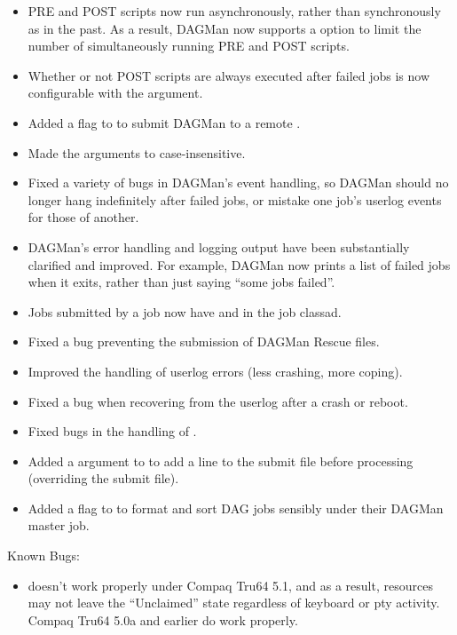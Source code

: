 \begin{itemize}

\item
PRE and POST scripts now run asynchronously, rather than synchronously
as in the past.  As a result, DAGMan now supports a 
option to limit the number of simultaneously running PRE and POST
scripts.

\item
Whether or not POST scripts are always executed after failed jobs is
now configurable with the  argument.

\item
Added a  flag to  to submit DAGMan to a
remote .

\item
Made the arguments to  case-insensitive.

\item
Fixed a variety of bugs in DAGMan's event handling, so DAGMan should
no longer hang indefinitely after failed jobs, or mistake one job's
userlog events for those of another.

\item
DAGMan's error handling and logging output have been substantially
clarified and improved.  For example, DAGMan now prints a list of
failed jobs when it exits, rather than just saying ``some jobs
failed''.

\item
Jobs submitted by a  job now have 
and  in the job classad.

\item
Fixed a  bug preventing the submission of DAGMan
Rescue files.

\item
Improved the handling of userlog errors (less crashing, more coping).

\item
Fixed a bug when recovering from the userlog after a crash or reboot.

\item
Fixed bugs in the handling of .

\item
Added a  argument to  to add a line to the
submit file before processing (overriding the submit file).

\item
Added a  flag to  to format and sort DAG jobs
sensibly under their DAGMan master job.

\end{itemize}

\noindent Known Bugs:

\begin{itemize}

\item {} doesn't work properly under Compaq Tru64 5.1, and
as a result, resources may not leave the ``Unclaimed'' state
regardless of keyboard or pty activity.  Compaq Tru64 5.0a and earlier
do work properly.

\end{itemize}
